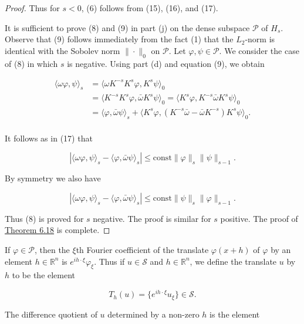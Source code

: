 \begin{proof}
Thus for $s < 0$, (6) follows from (15), (16), and (17).

It is sufficient to prove (8) and (9) in part (j) on the dense subspace  $ \mathcal{P} $ of  $ H_s $. Observe that (9) follows immediately from the fact (1) that the  $ L_2 $-norm is identical with the Sobolev norm  $ \|\cdot\|_0 $ on  $ \mathcal{P} $. Let  $ \varphi, \psi \in \mathcal{P} $. We consider the case of (8) in which  $ s $ is negative. Using part (d) and equation (9), we obtain

\[
\begin{aligned}{\langle\omega\varphi,\psi\rangle_{s}}&{{}=\langle\omega K^{-s}K^{s}\varphi,K^{s}\psi\rangle_{0}}\\ {}&{{}=\langle K^{-s}K^{s}\varphi,\bar{\omega}K^{s}\psi\rangle_{0}=\langle K^{s}\varphi,K^{-s}\bar{\omega}K^{s}\psi\rangle_{0}}\\ {}&{{}=\langle\varphi,\bar{\omega}\psi\rangle_{s}+\langle K^{s}\varphi,(K^{-s}\bar{\omega}-\bar{\omega}K^{-s})K^{s}\psi\rangle_{0}.}\\ \end{aligned}
\]

It follows as in (17) that

\[
|\langle\omega\varphi,\psi\rangle_{s}-\langle\varphi,\bar{\omega}\psi\rangle_{s}|\leq\mathrm{const}\|\varphi\|_{s}\|\psi\|_{s-1}.
\]

By symmetry we also have

\[
|\langle\omega\varphi,\psi\rangle_{s}-\langle\varphi,\bar{\omega}\psi\rangle_{s}|\leq\mathrm{const}\|\psi\|_{s}\|\varphi\|_{s-1}.
\]

Thus (8) is proved for $s$ negative. The proof is similar for $s$ positive. The proof of \hyperref[thm:6.18]{Theorem 6.18} is complete.
\end{proof}

\label{thm:6.19} If $\varphi \in \mathcal{P}$, then the $\xi$th Fourier coefficient of the translate $\varphi(x + h)$ of $\varphi$ by an element $h \in \mathbb{R}^n$ is $e^{ih \cdot \xi} \varphi_\xi$. Thus if $u \in \mathcal{S}$ and $h \in \mathbb{R}^n$, we define the translate $u$ by $h$ to be the element

\begin{equation}
\tag{1}\label{eq:6.19:1}
T_{h}(u)=\{e^{i h\cdot\xi}u_{\xi}\}\in\mathcal{S}.
\end{equation}

The difference quotient of $u$ determined by a non-zero $h$ is the element 

